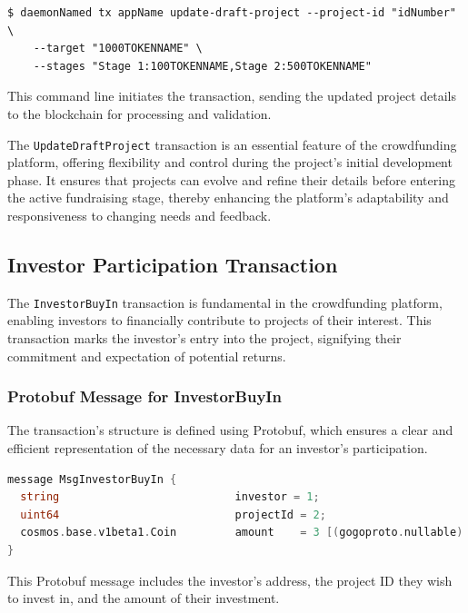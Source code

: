 \begin{verbatim}
$ daemonNamed tx appName update-draft-project --project-id "idNumber" \
    --target "1000TOKENNAME" \
    --stages "Stage 1:100TOKENNAME,Stage 2:500TOKENNAME"
\end{verbatim}

This command line initiates the transaction, sending the updated project details to the blockchain for processing and validation.

The \texttt{UpdateDraftProject} transaction is an essential feature of the crowdfunding platform, offering flexibility and control during the project's initial development phase. It ensures that projects can evolve and refine their details before entering the active fundraising stage, thereby enhancing the platform's adaptability and responsiveness to changing needs and feedback.

\subsection{Investor Participation Transaction}
\label{subsec:investor-participation}

The \texttt{InvestorBuyIn} transaction is fundamental in the crowdfunding platform, enabling investors to financially contribute to projects of their interest. This transaction marks the investor's entry into the project, signifying their commitment and expectation of potential returns.

\subsubsection{Protobuf Message for InvestorBuyIn}
\label{subsubsec:protobuf-investor-buyin}

The transaction's structure is defined using Protobuf, which ensures a clear and efficient representation of the necessary data for an investor's participation.

\begin{lstlisting}[language=go, caption=InvestorBuyIn protobuf definition, label={lst:investor_buyin_proto}]
message MsgInvestorBuyIn {
  string                           investor = 1;
  uint64                           projectId = 2;
  cosmos.base.v1beta1.Coin         amount    = 3 [(gogoproto.nullable) = false];
}
\end{lstlisting}

This Protobuf message includes the investor's address, the project ID they wish to invest in, and the amount of their investment.

